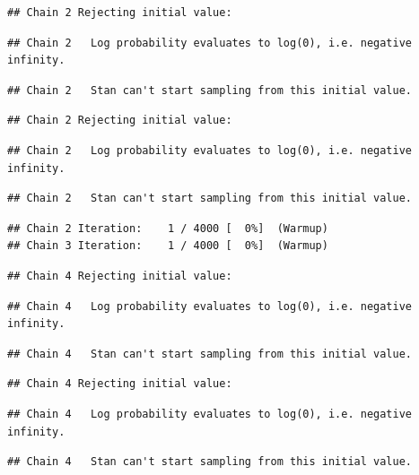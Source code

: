 \documentclass[
]{article}
\begin{document}
\begin{verbatim}
## Chain 2 Rejecting initial value:
\end{verbatim}

\begin{verbatim}
## Chain 2   Log probability evaluates to log(0), i.e. negative infinity.
\end{verbatim}

\begin{verbatim}
## Chain 2   Stan can't start sampling from this initial value.
\end{verbatim}

\begin{verbatim}
## Chain 2 Rejecting initial value:
\end{verbatim}

\begin{verbatim}
## Chain 2   Log probability evaluates to log(0), i.e. negative infinity.
\end{verbatim}

\begin{verbatim}
## Chain 2   Stan can't start sampling from this initial value.
\end{verbatim}

\begin{verbatim}
## Chain 2 Iteration:    1 / 4000 [  0%]  (Warmup) 
## Chain 3 Iteration:    1 / 4000 [  0%]  (Warmup)
\end{verbatim}

\begin{verbatim}
## Chain 4 Rejecting initial value:
\end{verbatim}

\begin{verbatim}
## Chain 4   Log probability evaluates to log(0), i.e. negative infinity.
\end{verbatim}

\begin{verbatim}
## Chain 4   Stan can't start sampling from this initial value.
\end{verbatim}

\begin{verbatim}
## Chain 4 Rejecting initial value:
\end{verbatim}

\begin{verbatim}
## Chain 4   Log probability evaluates to log(0), i.e. negative infinity.
\end{verbatim}

\begin{verbatim}
## Chain 4   Stan can't start sampling from this initial value.
\end{verbatim}
\end{document}
